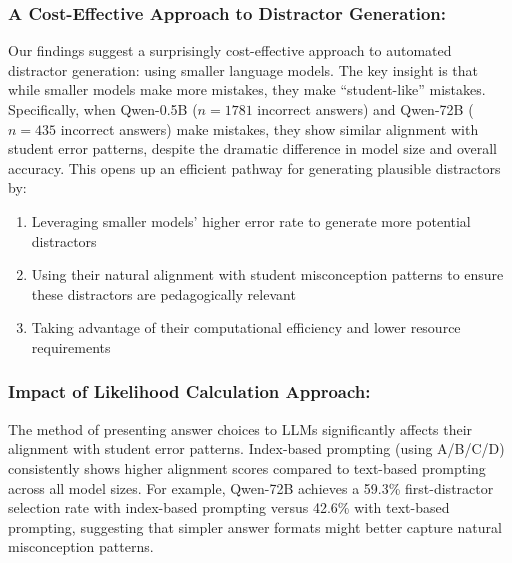 \subsubsection{A Cost-Effective Approach to Distractor Generation:} Our findings suggest a surprisingly cost-effective approach to automated distractor generation: using smaller language models. The key insight is that while smaller models make more mistakes, they make ``student-like'' mistakes. Specifically, when Qwen-0.5B ($n=1781$ incorrect answers) and Qwen-72B ($n=435$ incorrect answers) make mistakes, they show similar alignment with student error patterns, despite the dramatic difference in model size and overall accuracy. This opens up an efficient pathway for generating plausible distractors by:
\begin{enumerate}
    \item Leveraging smaller models' higher error rate to generate more potential distractors
    \item Using their natural alignment with student misconception patterns to ensure these distractors are pedagogically relevant
    \item Taking advantage of their computational efficiency and lower resource requirements
\end{enumerate}

\subsubsection{Impact of Likelihood Calculation Approach:} The method of presenting answer choices to LLMs significantly affects their alignment with student error patterns. Index-based prompting (using A/B/C/D) consistently shows higher alignment scores compared to text-based prompting across all model sizes. For example, Qwen-72B achieves a 59.3\% first-distractor selection rate with index-based prompting versus 42.6\% with text-based prompting, suggesting that simpler answer formats might better capture natural misconception patterns.
